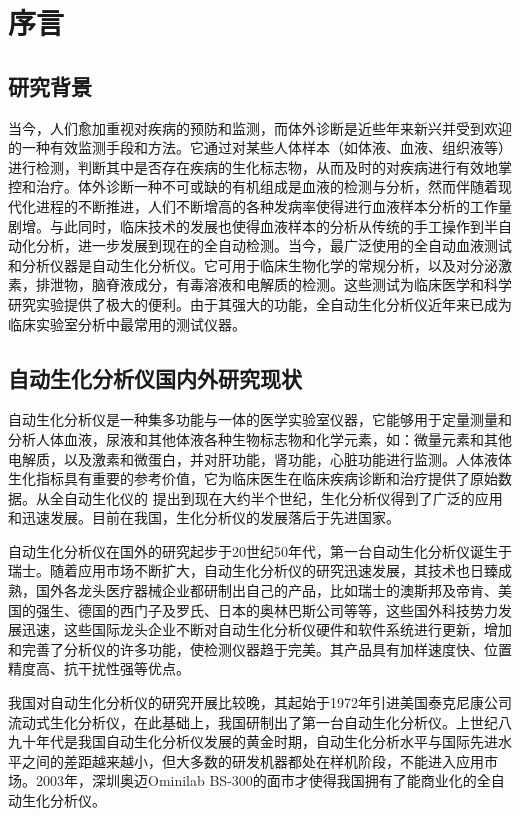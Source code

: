 
\chapter{序言}
\section{研究背景}
当今，人们愈加重视对疾病的预防和监测，而体外诊断是近些年来新兴并受到欢迎的一种有效监测手段和方法。它通过对某些人体样本（如体液、血液、组织液等）进行检测，判断其中是否存在疾病的生化标志物，从而及时的对疾病进行有效地掌控和治疗。体外诊断一种不可或缺的有机组成是血液的检测与分析，然而伴随着现代化进程的不断推进，人们不断增高的各种发病率使得进行血液样本分析的工作量剧增。与此同时，临床技术的发展也使得血液样本的分析从传统的手工操作到半自动化分析，进一步发展到现在的全自动检测。当今，最广泛使用的全自动血液测试和分析仪器是自动生化分析仪。它可用于临床生物化学的常规分析，以及对分泌激素，排泄物，脑脊液成分，有毒溶液和电解质的检测。这些测试为临床医学和科学研究实验提供了极大的便利。由于其强大的功能，全自动生化分析仪近年来已成为临床实验室分析中最常用的测试仪器。
\section{自动生化分析仪国内外研究现状}
自动生化分析仪是一种集多功能与一体的医学实验室仪器，它能够用于定量测量和分析人体血液，尿液和其他体液各种生物标志物和化学元素，如：微量元素和其他电解质，以及激素和微蛋白，并对肝功能，肾功能，心脏功能进行监测。人体液体生化指标具有重要的参考价值，它为临床医生在临床疾病诊断和治疗提供了原始数据。从全自动生化仪的 提出到现在大约半个世纪，生化分析仪得到了广泛的应用和迅速发展。目前在我国，生化分析仪的发展落后于先进国家。

自动生化分析仪在国外的研究起步于20世纪50年代，第一台自动生化分析仪诞生于瑞士。随着应用市场不断扩大，自动生化分析仪的研究迅速发展，其技术也日臻成熟，国外各龙头医疗器械企业都研制出自己的产品，比如瑞士的澳斯邦及帝肯、美国的强生、德国的西门子及罗氏、日本的奥林巴斯公司等等\supercite{bib2}，这些国外科技势力发展迅速，这些国际龙头企业不断对自动生化分析仪硬件和软件系统进行更新，增加和完善了分析仪的许多功能，使检测仪器趋于完美。其产品具有加样速度快、位置精度高、抗干扰性强等优点。

我国对自动生化分析仪的研究开展比较晚，其起始于1972年引进美国泰克尼康公司流动式生化分析仪，在此基础上，我国研制出了第一台自动生化分析仪。上世纪八九十年代是我国自动生化分析仪发展的黄金时期，自动生化分析水平与国际先进水平之间的差距越来越小，但大多数的研发机器都处在样机阶段，不能进入应用市场。2003年，深圳奥迈Ominilab BS-300的面市才使得我国拥有了能商业化的全自动生化分析仪\supercite{bib1}。

